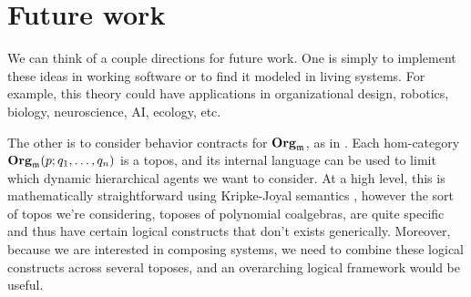\documentclass[11pt, one side, article]{memoir}
\begin{document}







\chapter{Future work}

We can think of a couple directions for future work. 
One
is simply to implement these ideas in working software or to find it modeled in living systems. For example, this theory could have applications in organizational design, robotics, biology, neuroscience, AI, ecology, etc. 


The
other
is to consider behavior contracts for $\mathbf{Org}_{\mathfrak{m}}$, as in \cite{schultz2016dynamical,spivak2021learnersv1}. Each hom-category $\mathbf{Org}_{\mathfrak{m}}(p;q_1,\ldots,q_n)$ is a topos, and its internal language can be used to limit which dynamic hierarchical agents we want to consider. At a high level, this is mathematically straightforward using Kripke-Joyal semantics \cite[Chapter VI]{macLane1992sheaves}, however the sort of topos we're considering, toposes of polynomial coalgebras, are quite specific and thus have certain logical constructs that don't exists generically. Moreover, because we are interested in composing systems, we need to combine these logical constructs across several toposes, and an overarching logical framework would be useful.

\printbibliography
\end{document}

